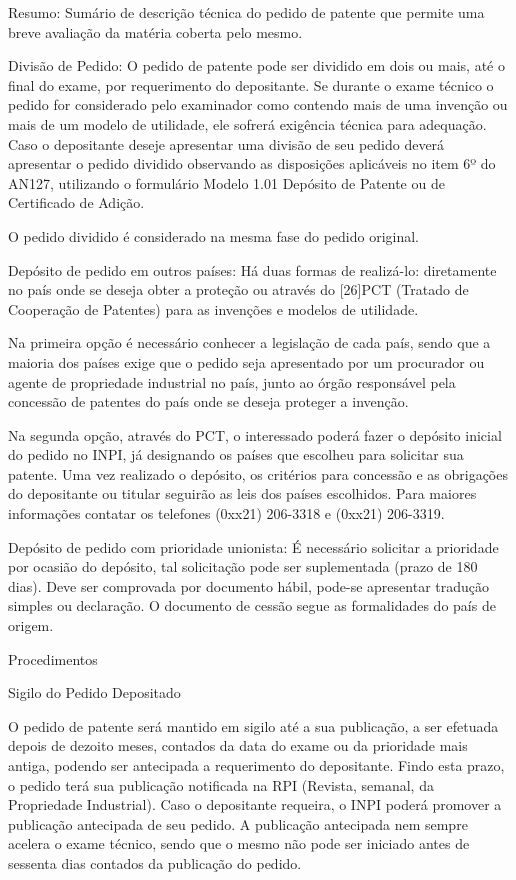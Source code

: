 \documentclass[12pt]{article}
\begin{document}
     Resumo: Sumário de descrição técnica do pedido de patente que
     permite uma breve avaliação da matéria coberta pelo mesmo.
     
     Divisão de Pedido: O pedido de patente pode ser dividido em dois
     ou mais, até o final do exame, por requerimento do depositante.
     Se durante o exame técnico o pedido for considerado pelo
     examinador como contendo mais de uma invenção ou mais de um
     modelo de utilidade, ele sofrerá exigência técnica para
     adequação.  Caso o depositante deseje apresentar uma divisão de
     seu pedido deverá apresentar o pedido dividido observando as
     disposições aplicáveis no item 6º do AN127, utilizando o
     formulário Modelo 1.01 Depósito de Patente ou de Certificado de
     Adição.
     
     O pedido dividido é considerado na mesma fase do pedido original.
     
     Depósito de pedido em outros países: Há duas formas de
     realizá-lo: diretamente no país onde se deseja obter a proteção
     ou através do [26]PCT (Tratado de Cooperação de Patentes) para as
     invenções e modelos de utilidade.
     
     Na primeira opção é necessário conhecer a legislação de cada
     país, sendo que a maioria dos países exige que o pedido seja
     apresentado por um procurador ou agente de propriedade industrial
     no país, junto ao órgão responsável pela concessão de patentes do
     país onde se deseja proteger a invenção.
     
     Na segunda opção, através do PCT, o interessado poderá fazer o
     depósito inicial do pedido no INPI, já designando os países que
     escolheu para solicitar sua patente. Uma vez realizado o
     depósito, os critérios para concessão e as obrigações do
     depositante ou titular seguirão as leis dos países escolhidos.
     Para maiores informações contatar os telefones (0xx21) 206-3318 e
     (0xx21) 206-3319.
     
     Depósito de pedido com prioridade unionista: É necessário
     solicitar a prioridade por ocasião do depósito, tal solicitação
     pode ser suplementada (prazo de 180 dias). Deve ser comprovada
     por documento hábil, pode-se apresentar tradução simples ou
     declaração. O documento de cessão segue as formalidades do país
     de origem.

 Procedimentos

 Sigilo do Pedido Depositado
 
 O pedido de patente será mantido em sigilo até a sua publicação, a
 ser efetuada depois de dezoito meses, contados da data do exame ou da
 prioridade mais antiga, podendo ser antecipada a requerimento do
 depositante. Findo esta prazo, o pedido terá sua publicação
 notificada na RPI (Revista, semanal, da Propriedade Industrial). Caso
 o depositante requeira, o INPI poderá promover a publicação
 antecipada de seu pedido. A publicação antecipada nem sempre acelera
 o exame técnico, sendo que o mesmo não pode ser iniciado antes de
 sessenta dias contados da publicação do pedido.
\end{document}
